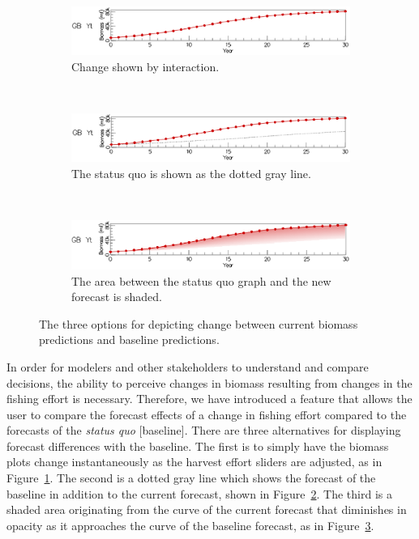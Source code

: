 \begin{figure}
\centering
	\begin{subfigure}[b]{0.8\textwidth}
		\centering
		\includegraphics[width=11cm]{figures/eps/msprod_change_none.eps}
		\caption{Change shown by interaction.}	
		\label{fig:changeNone}
	\end{subfigure}	\\
	\begin{subfigure}[b]{0.8\textwidth}
		\centering
		\includegraphics[width=11cm]{figures/eps/msprod_change_line.eps}
		\caption{The status quo is shown as the dotted gray line.}
		\label{fig:changeLine}
	\end{subfigure} \\
	\begin{subfigure}[b]{0.8\textwidth}
		\centering
		\includegraphics[width=11cm]{figures/eps/msprod_change_blend.eps}
		\caption{The area between the status quo graph and the new forecast is shaded.}
		\label{fig:changeBlend}
	\end{subfigure}
	\caption{The three options for depicting change between current biomass predictions and baseline predictions.}
	\label{fig:changeTypes}
\end{figure}

In order for modelers and other stakeholders to understand and compare decisions, the ability to perceive changes in biomass resulting from changes in the fishing effort is necessary.  Therefore, we have introduced a feature that allows the user to compare the forecast effects of a change in fishing effort compared to the forecasts of the \textit{status quo} [baseline]. There are three alternatives for displaying forecast differences with the baseline.  The first is to simply have the biomass plots change instantaneously as the harvest effort sliders are adjusted, as in Figure~\ref{fig:changeNone}.  The second is a dotted gray line which shows the forecast of the baseline in addition to the current forecast, shown in Figure~\ref{fig:changeLine}.  The third is a shaded area originating from the curve of the current forecast that diminishes in opacity as it approaches the curve of the baseline forecast, as in Figure~\ref{fig:changeBlend}.

